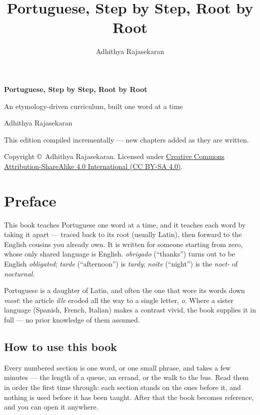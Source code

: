 \documentclass[11pt,twoside]{book}
\title{\Huge Portuguese, Step by Step, Root by Root}
\author{Adhithya Rajasekaran}
\date{}
\begin{document}
\raggedbottom

\frontmatter

\begin{titlepage}
  \centering
  \vspace*{3cm}
  {\Huge\bfseries Portuguese, Step by Step, Root by Root\par}
  \vspace{1cm}
  {\Large An etymology-driven curriculum, built one word at a time\par}
  \vspace{1.5cm}
  {\large Adhithya Rajasekaran\par}
  \vfill
  {\large This edition compiled incrementally --- new chapters added as they
  are written.\par}
  \vspace{2cm}
  {\normalsize
    Copyright \copyright\ Adhithya Rajasekaran. Licensed under
    \href{https://creativecommons.org/licenses/by-sa/4.0/}%
    {Creative Commons Attribution-ShareAlike 4.0 International (CC BY-SA 4.0)}.\par
  }
\end{titlepage}

\chapter*{Preface}

This book teaches Portuguese one word at a time, and it teaches each word by
taking it apart --- traced back to its root (usually Latin), then forward to the
English cousins you already own. It is written for someone starting from zero,
whose only shared language is English. \emph{obrigado} (``thanks'') turns out
to be English \emph{obligated}; \emph{tarde} (``afternoon'') is \emph{tardy};
\emph{noite} (``night'') is the \emph{noct-} of \emph{nocturnal}.

Portuguese is a daughter of Latin, and often the one that wore its words down
\emph{most}: the article \emph{ille} eroded all the way to a single letter,
\emph{o}. Where a sister language (Spanish, French, Italian) makes a contrast
vivid, the book supplies it in full --- no prior knowledge of them assumed.

\section*{How to use this book}

Every numbered section is one word, or one small phrase, and takes a few
minutes --- the length of a queue, an errand, or the walk to the bus. Read them
in order the first time through: each section stands on the ones before it, and
nothing is used before it has been taught. After that the book becomes
reference, and you can open it anywhere.
\end{document}
